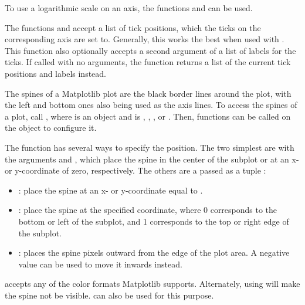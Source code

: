 To use a logarithmic scale on an axis, the functions  and  can be used.

The functions  and  accept a list of tick positions, which the ticks on the corresponding axis are set to.
Generally, this works the best when used with .
This function also optionally accepts a second argument of a list of labels for the ticks.
If called with no arguments, the function returns a list of the current tick positions and labels instead.

The spines of a Matplotlib plot are the black border lines around the plot, with the left and bottom ones also being used as the axis lines.
To access the spines of a plot, call , where  is an  object and  is , , , or .
Then, functions can be called on the  object to configure it.

The function  has several ways to specify the position.
The two simplest are with the arguments  and , which place the spine in the center of the subplot or at an x- or y-coordinate of zero, respectively.
The others are a passed as a tuple :
\begin{itemize}
\item {}: place the spine at an x- or y-coordinate equal to .
\item {}: place the spine at the specified  coordinate, where 0 corresponds to the bottom or left of the subplot, and 1 corresponds to the top or right edge of the subplot.
\item {}: places the spine  pixels outward from the edge of the plot area.
A negative value can be used to move it inwards instead.
\end{itemize}

 accepts any of the color formats Matplotlib supports.
Alternately, using  will make the spine not be visible.
 can also be used for this purpose.

